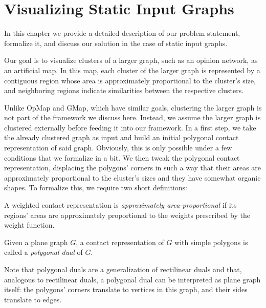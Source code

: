 \chapter{Visualizing Static Input Graphs}
\label{chap:visualizing-static-input-graphs}

In this chapter we provide a detailed description of our problem statement, formalize it, and discuss our solution in the case of static input graphs.

Our goal is to visualize clusters of a larger graph, such as an opinion network, as an artificial map. In this map, each cluster of the larger graph is represented by a contiguous region whose area is approximately proportional to the cluster's size, and neighboring regions indicate similarities between the respective clusters.

Unlike OpMap and GMap, which have similar goals, clustering the larger graph is not part of the framework we discuss here. Instead, we assume the larger graph is clustered externally before feeding it into our framework. In a first step, we take the already clustered graph as input and build an initial polygonal contact representation of said graph. Obviously, this is only possible under a few conditions that we formalize in a bit. We then tweak the polygonal contact representation, displacing the polygons' corners in such a way that their areas are approximately proportional to the cluster's sizes and they have somewhat organic shapes. To formalize this, we require two short definitions:

\begin{definition}
	A weighted contact representation is \emph{approximately area-proportional} if its regions' areas are approximately proportional to the weights prescribed by the weight function.
\end{definition}

\begin{definition}
	Given a plane graph $G$, a contact representation of $G$ with simple polygons is called a \emph{polygonal dual} of $G$.
\end{definition}

Note that polygonal duals are a generalization of rectilinear duals and that, analogous to rectilinear duals, a polygonal dual can be interpreted as plane graph itself: the polygons' corners translate to vertices in this graph, and their sides translate to edges.


